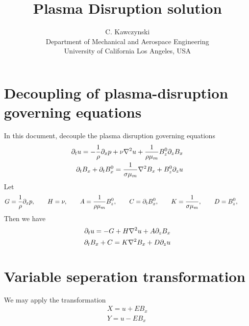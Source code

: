 \documentclass[11pt]{article}
\begin{document}
\doublespacing
\title{Plasma Disruption solution}
\author{C. Kawczynski \\
Department of Mechanical and Aerospace Engineering \\
University of California Los Angeles, USA\\
}
\maketitle

\section{Decoupling of plasma-disruption governing equations}
In this document, decouple the plasma disruption governing equations
\begin{equation}\begin{aligned}
\partial_t u                 = -\frac{1}{\rho}\partial_x p+ \nu \nabla^2 u + \frac{1}{\rho {\mu_m}} B_z^0 \partial_z B_x \\
\partial_t B_x + \partial_t B_x^0 = \frac{1}{\sigma {\mu_m}} \nabla^2 B_x + B_z^0 \partial_z u \\
\end{aligned} \end{equation}
Let
\begin{equation}\begin{aligned}
G = \frac{1}{\rho}\partial_x p, \qquad
H = \nu, \qquad
A = \frac{1}{\rho {\mu_m}} B_z^0, \qquad
C = \partial_t B_x^0, \qquad
K = \frac{1}{\sigma {\mu_m}}, \qquad
D = B_z^0, \qquad
\end{aligned} \end{equation}
Then we have
\begin{equation}\begin{aligned}
\partial_t u                 = -G+ H \nabla^2 u + A \partial_z B_x \\
\partial_t B_x + C = K \nabla^2 B_x + D \partial_z u \\
\end{aligned} \end{equation}

\section{Variable seperation transformation}
We may apply the transformation
\begin{equation}\begin{aligned}
X = u + E B_x \\
Y = u - E B_x \\
\end{aligned} \end{equation}
\end{document}
